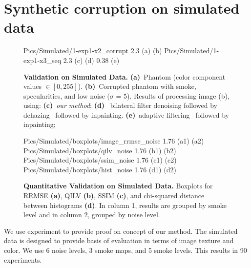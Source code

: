 \section{Synthetic corruption on simulated data}

\begin{figure}[h]
     {Pics/Simulated/1-exp1-x2_corrupt} {2.3} {(a)} {(b)}
     {Pics/Simulated/1-exp1-x3_seq} {2.3} {(c)} {(d)}
     {0.38} {(e)}
    \caption
    {
        {\bf Validation on Simulated Data. }
        {\bf (a)}~Phantom (color component values $\in [0,255]$).
        {\bf (b)}~Corrupted phantom with smoke, specularities, and low noise ($\sigma$ = 5).
        Results of processing image (b), using:
        {\bf (c)}~{\em our method};
        {\bf (d)}~ bilateral filter denoising followed by dehazing~\cite{he2011dark} followed by inpainting.
        {\bf (e)}~adaptive filtering~\cite{gibson2013wiener} followed by inpainting;
    }
    \label{fig:imagesPhantom1}
\end{figure}

\begin{figure}[h]
     {Pics/Simulated/boxplots/image_rrmse_noise} {1.76} {(a1)} {(a2)}
     {Pics/Simulated/boxplots/qilv_noise} {1.76} {(b1)} {(b2)}
     {Pics/Simulated/boxplots/ssim_noise} {1.76} {(c1)} {(c2)}
     {Pics/Simulated/boxplots/hist_noise} {1.76} {(d1)} {(d2)}
    \caption
    {
        {\bf Quantitative Validation on Simulated Data.}
        Boxplots for RRMSE \textbf{(a)}, QILV \textbf{(b)}, SSIM \textbf{(c)}, and chi-squared distance between histograms \textbf{(d)}.
        In column 1, results are grouped by smoke level and in column 2, grouped by noise level.
    }
    \label{fig:resultsQuantSimulated}
\end{figure}



We use  experiment to provide proof on concept of our method. The simulated data is designed to provide basis of evaluation in terms of image texture and color. We use 6 noise levels, 3 smoke maps, and 5 smoke levels. This results in 90 experiments.

